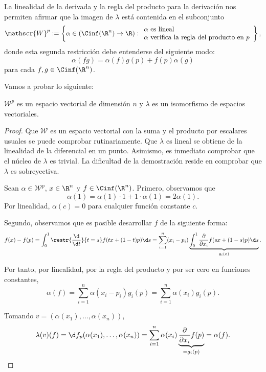 La linealidad de la derivada y la regla del producto para la derivación nos
permiten afirmar que la imagen de $\lambda$ está contenida en el subconjunto
\[
  \mathscr{W}^{p} := \left\{ \alpha\in(\Cinf(\R^{n})\to\R) :
    \begin{array}{l}
      \alpha\text{ es lineal} \\
      \alpha\text{ verifica la regla del producto en $p$}
    \end{array}
\right\}
,\]
donde esta segunda restricción debe entenderse del siguiente modo:
\[
  \alpha(fg) = \alpha(f)g(p) + f(p)\alpha(g)
\]
para cada $f,g\in\Cinf(\R^{n})$.

Vamos a probar lo siguiente:
\begin{nth}
  $\mathscr{W}^{p}$ es un espacio vectorial de dimensión $n$ y $\lambda$ es un
  isomorfismo de espacios vectoriales.
\end{nth}
\begin{proof}
  Que $\mathscr{W}$ es un espacio vectorial con la suma y el producto por
  escalares usuales se puede comprobar rutinariamente. Que $\lambda$ es lineal
  se obtiene de la linealidad de la diferencial en un punto. Asimismo, es
  inmediato comprobar que el núcleo de $\lambda$ es trivial. La dificultad de la
  demostración reside en comprobar que $\lambda$ es sobreyectiva.

  Sean $\alpha\in \mathscr{W}^{p}$, $x\in \R^{n}$ y
  $f\in\Cinf(\R^{n})$. Primero, observamos que
  \[
    \alpha(1) = \alpha(1)\cdot 1 + 1\cdot\alpha(1) = 2\alpha(1)
  .\]
  Por linealidad, $\alpha(c) = 0$ para cualquier función constante $c$.

  Segundo, observamos que es posible desarrollar $f$ de la siguiente forma:
  \[
    f(x)-f(p) = \int_{0}^{1} \restr{\frac{\d}{\d t}}{t = s}f(tx+(1-t)p)\d s =
    \sum_{i=1}^{n}(x_{i}-p_{i})\underbrace{\int_{0}^{1}\frac{\partial}{\partial
        x_{i}}f(sx + (1-s)p)\d s}_{g_{i}(x)}
  .\]

Por tanto, por linealidad, por la regla del producto y por ser cero en funciones
constantes,
\[
  \alpha(f) = \sum_{i=1}^{n} \alpha(x_{i}-p_{i})g_{i}(p) = \sum_{i=1}^{n} \alpha(x_{i})g_{i}(p)
.\]

Tomando $v = (\alpha(x_{1}), \dots, \alpha(x_{n}))$,
\[
  \lambda(v)(f) = \d f_{p}(\alpha(x_{1}),\dots,\alpha(x_{n})) = \sum_{i=1}^{n}
  \alpha(x_{i})\underbrace{\frac{\partial}{\partial x_{i}}f(p)}_{=g_{i}(p)} = \alpha(f)
.\]
\end{proof}